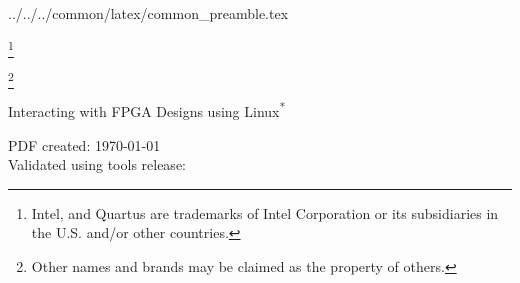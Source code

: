 %
%
%
%
%

\newcommand{\repoTopPath}{../../..}
\newcommand{\commonPreamblePath}{\repoTopPath/common/latex/common_preamble.tex}
 \commonPreamblePath


\sffamily

\begin{center}
\let\savethefootnote\thefootnote
\let\thefootnote\relax\footnote{Intel, and Quartus are trademarks of Intel Corporation or its subsidiaries in the U.S. and/or other countries.}
\addtocounter{footnote}{-1}
\let\thefootnote\savethefootnote
\hspace{-1em}
\let\savethefootnote\thefootnote
\let\thefootnote\relax\footnote{Other names and brands may be claimed as the property of others.}
\addtocounter{footnote}{-1}
\let\thefootnote\savethefootnote
\hspace{-1em}
\LARGE{Interacting with FPGA Designs using Linux\textsuperscript{*}}\\[1em]
\end{center}

\begin{flushleft}
\normalsize{PDF created: \today}\\
\normalsize{Validated using tools release: \TheToolsReleaseVersion}
\end{flushleft}

